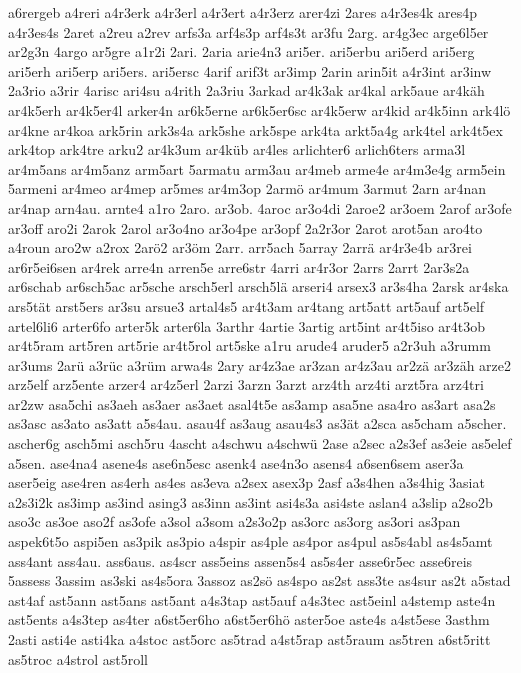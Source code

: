 {a6rergeb
a4reri
a4r3erk
a4r3erl
a4r3ert
a4r3erz
arer4zi
2ares
a4r3es4k
ares4p
a4r3es4s
2aret
a2reu
a2rev
arfs3a
arf4s3p
arf4s3t
ar3fu
2arg.
ar4g3ec
arge6l5er
ar2g3n
4argo
ar5gre
a1r2i
2ari.
2aria
arie4n3
ari5er.
ari5erbu
ari5erd
ari5erg
ari5erh
ari5erp
ari5ers.
ari5ersc
4arif
arif3t
ar3imp
2arin
arin5it
a4r3int
ar3inw
2a3rio
a3rir
4arisc
ari4su
a4rith
2a3riu
3arkad
ar4k3ak
ar4kal
ark5aue
ar4käh
ar4k5erh
ar4k5er4l
arker4n
ar6k5erne
ar6k5er6sc
ar4k5erw
ar4kid
ar4k5inn
ark4lö
ar4kne
ar4koa
ark5rin
ark3s4a
ark5she
ark5spe
ark4ta
arkt5a4g
ark4tel
ark4t5ex
ark4top
ark4tre
arku2
ar4k3um
ar4küb
ar4les
arlichter6
arlich6ters
arma3l
ar4m5ans
ar4m5anz
arm5art
5armatu
arm3au
ar4meb
arme4e
ar4m3e4g
arm5ein
5armeni
ar4meo
ar4mep
ar5mes
ar4m3op
2armö
ar4mum
3armut
2arn
ar4nan
ar4nap
arn4au.
arnte4
a1ro
2aro.
ar3ob.
4aroc
ar3o4di
2aroe2
ar3oem
2arof
ar3ofe
ar3off
aro2i
2arok
2arol
ar3o4no
ar3o4pe
ar3opf
2a2r3or
2arot
arot5an
aro4to
a4roun
aro2w
a2rox
2arö2
ar3öm
2arr.
arr5ach
5array
2arrä
ar4r3e4b
ar3rei
ar6r5ei6sen
ar4rek
arre4n
arren5e
arre6str
4arri
ar4r3or
2arrs
2arrt
2ar3s2a
ar6schab
ar6sch5ac
ar5sche
arsch5erl
arsch5lä
arseri4
arsex3
ar3s4ha
2arsk
ar4ska
ars5tät
arst5ers
ar3su
arsue3
artal4s5
ar4t3am
ar4tang
art5att
art5auf
art5elf
artel6li6
arter6fo
arter5k
arter6la
3arthr
4artie
3artig
art5int
ar4t5iso
ar4t3ob
ar4t5ram
art5ren
art5rie
ar4t5rol
art5ske
a1ru
arude4
aruder5
a2r3uh
a3rumm
ar3ums
2arü
a3rüc
a3rüm
arwa4s
2ary
ar4z3ae
ar3zan
ar4z3au
ar2zä
ar3zäh
arze2
arz5elf
arz5ente
arzer4
ar4z5erl
2arzi
3arzn
3arzt
arz4th
arz4ti
arzt5ra
arz4tri
ar2zw
asa5chi
as3aeh
as3aer
as3aet
asal4t5e
as3amp
asa5ne
asa4ro
as3art
asa2s
as3asc
as3ato
as3att
a5s4au.
asau4f
as3aug
asau4s3
as3ät
a2sca
as5cham
a5scher.
ascher6g
asch5mi
asch5ru
4ascht
a4schwu
a4schwü
2ase
a2sec
a2s3ef
as3eie
as5elef
a5sen.
ase4na4
asene4s
ase6n5esc
asenk4
ase4n3o
asens4
a6sen6sem
aser3a
aser5eig
ase4ren
as4erh
as4es
as3eva
a2sex
asex3p
2asf
a3s4hen
a3s4hig
3asiat
a2s3i2k
as3imp
as3ind
asing3
as3inn
as3int
asi4s3a
asi4ste
aslan4
a3slip
a2so2b
aso3c
as3oe
aso2f
as3ofe
a3sol
a3som
a2s3o2p
as3orc
as3org
as3ori
as3pan
aspek6t5o
aspi5en
as3pik
as3pio
a4spir
as4ple
as4por
as4pul
as5s4abl
as4s5amt
ass4ant
ass4au.
ass6aus.
as4scr
ass5eins
assen5s4
as5s4er
asse6r5ec
asse6reis
5assess
3assim
as3ski
as4s5ora
3assoz
as2sö
as4spo
as2st
ass3te
as4sur
as2t
a5stad
ast4af
ast5ann
ast5ans
ast5ant
a4s3tap
ast5auf
a4s3tec
ast5einl
a4stemp
aste4n
ast5ents
a4s3tep
as4ter
a6st5er6ho
a6st5er6hö
aster5oe
aste4s
a4st5ese
3asthm
2asti
asti4e
asti4ka
a4stoc
ast5orc
as5trad
a4st5rap
ast5raum
as5tren
a6st5ritt
as5troc
a4strol
ast5roll
}
